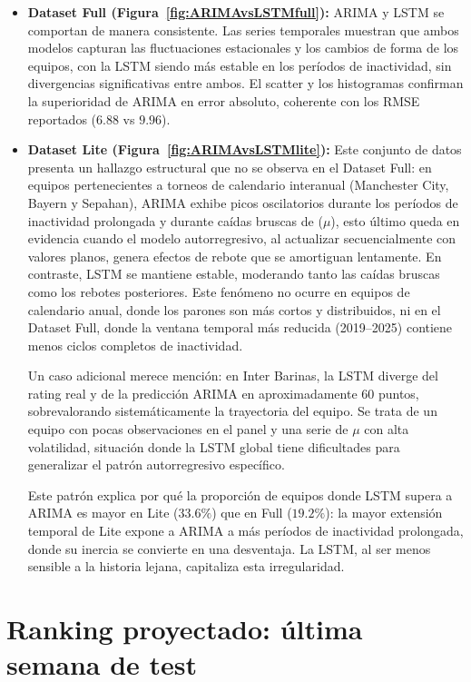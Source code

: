 \begin{itemize}
	\item \textbf{Dataset Full (Figura~\ref{fig:ARIMAvsLSTMfull}):} ARIMA y LSTM se comportan de manera consistente. Las series temporales muestran que ambos modelos capturan las fluctuaciones estacionales y los cambios de forma de los equipos, con la LSTM siendo m\'as estable en los per\'iodos de inactividad, sin divergencias significativas entre ambos. El scatter y los histogramas confirman la superioridad de ARIMA en error absoluto, coherente con los RMSE reportados (\(6.88\) vs \(9.96\)).
	
	\item \textbf{Dataset Lite (Figura~\ref{fig:ARIMAvsLSTMlite}):} Este conjunto de datos presenta un hallazgo estructural que no se observa en el Dataset Full: en equipos pertenecientes a torneos de calendario interanual (Manchester City, Bayern y Sepahan), ARIMA exhibe picos oscilatorios durante los per\'iodos de inactividad prolongada y durante ca\'idas bruscas de (\(\mu\)), esto \'ultimo queda en evidencia cuando el modelo autorregresivo, al actualizar secuencialmente con valores planos, genera efectos de rebote que se amortiguan lentamente. En contraste, LSTM se mantiene estable, moderando tanto las ca\'idas bruscas como los rebotes posteriores. Este fen\'omeno no ocurre en equipos de calendario anual, donde los parones son m\'as cortos y distribuidos, ni en el Dataset Full, donde la ventana temporal m\'as reducida (2019--2025) contiene menos ciclos completos de inactividad.
	
	Un caso adicional merece menci\'on: en Inter Barinas, la LSTM diverge del rating real y de la predicci\'on ARIMA en aproximadamente 60 puntos, sobrevalorando sistem\'aticamente la trayectoria del equipo. Se trata de un equipo con pocas observaciones en el panel y una serie de $\mu$ con alta volatilidad, situaci\'on donde la LSTM global tiene dificultades para generalizar el patr\'on autorregresivo espec\'ifico.
	
	Este patr\'on explica por qu\'e la proporci\'on de equipos donde LSTM supera a ARIMA es mayor en Lite ($33{.}6\%$) que en Full ($19{.}2\%$): la mayor extensi\'on temporal de Lite expone a ARIMA a m\'as per\'iodos de inactividad prolongada, donde su inercia se convierte en una desventaja. La LSTM, al ser menos sensible a la historia lejana, capitaliza esta irregularidad.
\end{itemize}

\section{Ranking proyectado: \'ultima semana de test}
\label{ap:ranking_proyectado}

